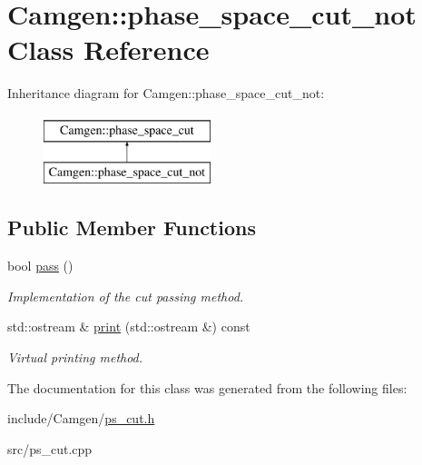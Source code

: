 \hypertarget{a00421}{}\section{Camgen\+:\+:phase\+\_\+space\+\_\+cut\+\_\+not Class Reference}
\label{a00421}
Inheritance diagram for Camgen\+:\+:phase\+\_\+space\+\_\+cut\+\_\+not\+:\begin{figure}[H]
\begin{center}
\leavevmode
\includegraphics[height=2.000000cm]{a00421}
\end{center}
\end{figure}
\subsection*{Public Member Functions}
\begin{DoxyCompactItemize}
\item 
\hypertarget{a00421_ac098fe2985aec376549335065cb69b67}{}bool \hyperlink{a00421_ac098fe2985aec376549335065cb69b67}{pass} ()\label{a00421_ac098fe2985aec376549335065cb69b67}

\begin{DoxyCompactList}\small\item\em Implementation of the cut passing method. \end{DoxyCompactList}\item 
\hypertarget{a00421_ae428e1eb98edf7df356eefff2cf9372a}{}std\+::ostream \& \hyperlink{a00421_ae428e1eb98edf7df356eefff2cf9372a}{print} (std\+::ostream \&) const \label{a00421_ae428e1eb98edf7df356eefff2cf9372a}

\begin{DoxyCompactList}\small\item\em Virtual printing method. \end{DoxyCompactList}\end{DoxyCompactItemize}


The documentation for this class was generated from the following files\+:\begin{DoxyCompactItemize}
\item 
include/\+Camgen/\hyperlink{a00741}{ps\+\_\+cut.\+h}\item 
src/ps\+\_\+cut.\+cpp\end{DoxyCompactItemize}
